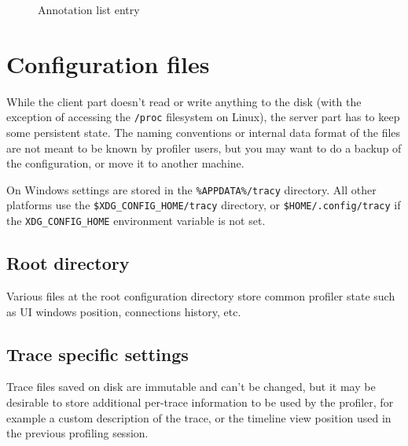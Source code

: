 \documentclass[hidelinks,titlepage,a4paper]{article}
\begin{document}
\begin{figure}[h]
\centering{}
\caption{Annotation list entry}
\label{figannlist}
\end{figure}

\section{Configuration files}

While the client part doesn't read or write anything to the disk (with the exception of accessing the \texttt{/proc} filesystem on Linux), the server part has to keep some persistent state. The naming conventions or internal data format of the files are not meant to be known by profiler users, but you may want to do a backup of the configuration, or move it to another machine.

On Windows settings are stored in the \texttt{\%APPDATA\%/tracy} directory. All other platforms use the \texttt{\$XDG\_CONFIG\_HOME/tracy} directory, or \texttt{\$HOME/.config/tracy} if the \texttt{XDG\_CONFIG\_HOME} environment variable is not set.

\subsection{Root directory}

Various files at the root configuration directory store common profiler state such as UI windows position, connections history, etc.

\subsection{Trace specific settings}
\label{tracespecific}

Trace files saved on disk are immutable and can't be changed, but it may be desirable to store additional per-trace information to be used by the profiler, for example a custom description of the trace, or the timeline view position used in the previous profiling session.
\end{document}
